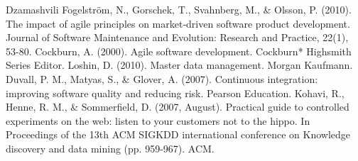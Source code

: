 \documentclass[lnbip]{svmultln}
\begin{document}
\begin{thebibliography}{5}
 Dzamashvili Fogelström, N., Gorschek, T., Svahnberg, M., \& Olsson, P. (2010). The impact of agile principles on market‐driven software product development. Journal of Software Maintenance and Evolution: Research and Practice, 22(1), 53-80.
 Cockburn, A. (2000). Agile software development. Cockburn* Highsmith Series Editor.
 Loshin, D. (2010). Master data management. Morgan Kaufmann.
 Duvall, P. M., Matyas, S., \& Glover, A. (2007). Continuous integration: improving software quality and reducing risk. Pearson Education.
 Kohavi, R., Henne, R. M., \& Sommerfield, D. (2007, August). Practical guide to controlled experiments on the web: listen to your customers not to the hippo. In Proceedings of the 13th ACM SIGKDD international conference on Knowledge discovery and data mining (pp. 959-967). ACM.

\end{thebibliography}
%
\end{document}
